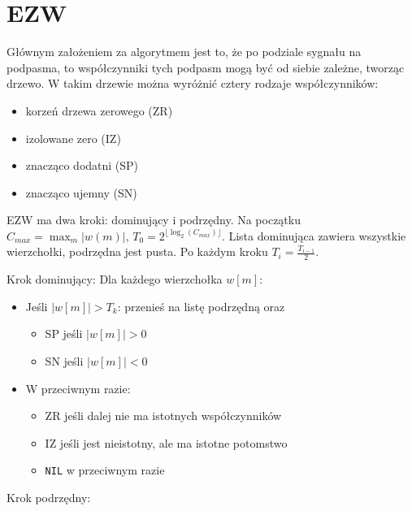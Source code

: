 \documentclass{../notatki}
\begin{document}
\section{EZW}

Głównym założeniem za algorytmem jest to, że po podziale sygnału na
podpasma, to współczynniki tych podpasm mogą być od siebie zależne, tworząc
drzewo. W takim drzewie można wyróżnić cztery rodzaje współczynników:
\begin{itemize}
  \item korzeń drzewa zerowego (ZR)
  \item izolowane zero (IZ)
  \item znacząco dodatni (SP)
  \item znacząco ujemny (SN)
\end{itemize}

EZW ma dwa kroki: dominujący i podrzędny. Na początku $C_{max} = \max_m |w(m)|$,
$T_0 = 2^{\lfloor \log_2(C_{max})\rfloor}$. Lista dominująca zawiera wszystkie
wierzchołki, podrzędna jest pusta. Po każdym kroku $T_i = \frac{T_{i-1}}{2}$.

Krok dominujący: Dla każdego wierzchołka $w[m]$:
\begin{itemize}
  \item Jeśli $|w[m]| > T_k$:
    przenieś na listę podrzędną oraz
    \begin{itemize}
      \item SP jeśli $|w[m]| > 0$
      \item SN jeśli $|w[m]| < 0$
    \end{itemize}
  \item W przeciwnym razie:
    \begin{itemize}
      \item ZR jeśli dalej nie ma istotnych współczynników
      \item IZ jeśli jest nieistotny, ale ma istotne potomstwo
      \item \texttt{NIL} w przeciwnym razie
    \end{itemize}
\end{itemize}

Krok podrzędny:
\end{document}
